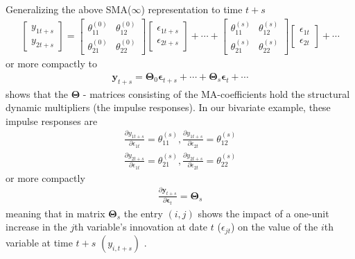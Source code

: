 \documentclass[a4paper,11pt,listof=nochaptergap,oneside,pointednumbers,bibtotoc,bigheadings,liststotoc,hidelinks]{scrbook}
\theoremstyle{mysatz}
\theoremstyle{mydefinition}
\theoremstyle{mytheorem}
\theoremstyle{mybemerkung}
\newcommand{\vect}[1]{\boldsymbol{\mathbf{#1}}}
\begin{document}
Generalizing the above SMA($\infty$) representation to time $t+s$
\begin{equation} \label{eq:svar10}
\begin{split}
	\begin{bmatrix}
    	y_{1t+s} \\
    	y_{2t+s}
 	\end{bmatrix} 
	=
	\begin{bmatrix}
    	\theta_{11}^{(0)} & \theta_{12}^{(0)}\\
    	\theta_{21}^{(0)} & \theta_{22}^{(0)}
 	\end{bmatrix} 
	\begin{bmatrix}
    	\epsilon_{1t + s} \\
	\epsilon_{2t+s}
 	\end{bmatrix} + \cdots +
	\begin{bmatrix}
    	\theta_{11}^{(s)} & \theta_{12}^{(s)}\\
    	\theta_{21}^{(s)} & \theta_{22}^{(s)}
 	\end{bmatrix} 
	\begin{bmatrix}
    	\epsilon_{1t} \\
	\epsilon_{2t}
 	\end{bmatrix} + \cdots 
\end{split}								
\end{equation}
or more compactly to 
\begin{equation} \label{eq:svar8_1}
\begin{split}
 		\vect{y}_{t+s} = 
		\vect{\Theta}_0\vect{\epsilon}_{t+s} + \cdots + \vect{\Theta}_s\vect{\epsilon}_{t} + \cdots
\end{split}								
\end{equation}
shows that the $\vect{\Theta}$ - matrices consisting of the MA-coefficients hold the structural dynamic multipliers (the impulse responses). In our bivariate example, these impulse responses are
\begin{equation} \label{eq:svar9}
\begin{split}
 		\frac{\partial y_{1t+s}}{\partial \epsilon_{1t}} = \theta_{11}^{(s)}, \frac{\partial y_{1t+s}}{\partial \epsilon_{2t}} = \theta_{12}^{(s)} \\
		\frac{\partial y_{2t+s}}{\partial \epsilon_{1t}} = \theta_{21}^{(s)}, \frac{\partial y_{2t+s}}{\partial \epsilon_{2t}} = \theta_{22}^{(s)}
\end{split}								
\end{equation}
or more compactly 
\begin{equation} \label{eq:svar10}
\begin{split}
 		\frac{\partial \vect{y}_{t+s}}{\partial \vect{\epsilon}_{t}} =  \vect{\Theta}_s
\end{split}								
\end{equation}
meaning that in matrix $\vect{\Theta}_s$ the entry $(i, j)$ shows the impact of a one-unit increase in the $j$th variable's innovation at date $t$ ($\epsilon_{jt}$) on the value of the $i$th variable at time $t+s$ $(y_{i, t + s})$ \citep{zivot:00}.
\end{document}

